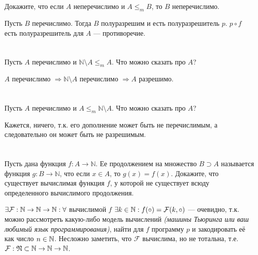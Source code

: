 



\setcounter{section}{147}

\section{}
Докажите, что если $A$ неперечислимо и $A \le_m B$, то $B$ неперечислимо.

Пусть \(B\) перечислимо. Тогда \(B\) полуразрешим и есть полуразрешитель \(p\). \(p \circ f\) есть полуразрешитель для \(A\) --- противоречие.

\section{}
Пусть $A$ перечислимо и $\mathbb{N} \setminus A \le_m A$. Что можно сказать про $A$?

\(A\) перечислимо \(\Rightarrow \mathbb{N} \setminus A\) перечислимо \(\Rightarrow A\) разрешимо.

\section{}
Пусть $A$ перечислимо и $A \le_m \mathbb{N} \setminus A$. Что можно сказать про $A$?

Кажется, ничего, т.к. его дополнение может быть не перечислимым, а следовательно он может быть не разрешимым.

\section{}
Пусть дана функция $f : A \to \mathbb{N}$. Ее продолжением на множество $B \supset A$ называется функция $g:B \to \mathbb{N}$, что если $x\in A$, то $g(x) = f(x)$. Докажите, что существует вычислимая функция $f$, у которой не существует всюду определенного вычислимого продолжения.


\(\exists \mathcal{F} : \mathbb{N} \to \mathbb{N} \to \mathbb{N} : \forall\) вычислимой \(f\) \(\exists k \in \mathbb{N} : f(\circ) = \mathcal{F}(k, \circ)\) --- очевидно, т.к. можно рассмотреть какую-либо модель вычислений \textit{(машины Тьюринга или ваш любимый язык программирования)}, найти для \(f\) программу \(p\) и закодировать её как число \(n \in \mathbb{N}\). Несложно заметить, что \(\mathcal{F}\) вычислима, но не тотальна, т.е. \(\mathcal{F} : \mathfrak{N} \subset \mathbb{N} \to \mathbb{N} \to \mathbb{N}\).


